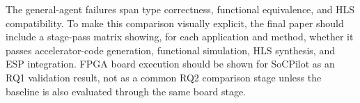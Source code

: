 The general-agent failures span type correctness, functional equivalence, and HLS compatibility. To make this comparison visually explicit, the final paper should include a stage-pass matrix showing, for each application and method, whether it passes accelerator-code generation, functional simulation, HLS synthesis, and ESP integration. FPGA board execution should be shown for SoCPilot as an RQ1 validation result, not as a common RQ2 comparison stage unless the baseline is also evaluated through the same board stage.


